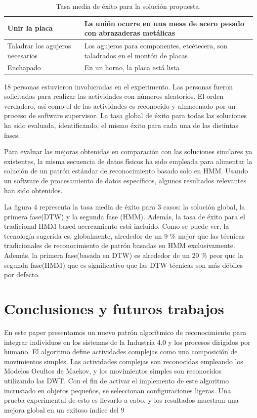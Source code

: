 \documentclass{article}
\begin{document}
\begin{table}[h]
\begin{center}
\begin{tabular}{ | p{4cm} | p{9cm} | }
			Unir la placa                                      & La unión ocurre en una mesa de acero pesado con abrazaderas metálicas                                                    \\ \hline
			Taladrar los agujeros necesarios                   & Los agujeros para componentes, etcétecera, son taladrados en el montón de placas                                         \\ \hline
			Enchapado                                          & En un horno, la placa está lista                                                                                         \\ \hline
		\end{tabular}
	\end{center}
	\caption{\label{fig:frog}Tasa media de éxito para la solución propuesta.}
\end{table}


18 personas estuvieron involucradas en el experimento. Las personas fueron solicitadas para realizar las actividades con números aleatorios. El orden verdadero, así como el de las actividades es reconocido y almacenado por un proceso de software supervisor. La tasa global de éxito para todas las soluciones ha sido evaluada, identificando, el mismo éxito para cada una de las distintas fases.

Para evaluar las mejoras obtenidas en comparación con las soluciones similares ya existentes, la misma secuencia de datos físicos ha sido empleada para alimentar la solución de un patrón estándar de reconocimiento basado solo en HMM. Usando un software de procesamiento de datos específicos, algunos resultados relevantes han sido obtenidos.

La figura 4 representa la tasa media de éxito para 3 casos: la solución global, la primera fase(DTW) y la segunda fase (HMM). Además, la tasa de éxito para el tradicional HMM-based acercamiento está incluido. Como se puede ver, la tecnología sugerida es, globalmente, alrededor de un 9 \% mejor que  las técnicas tradicionales de reconocimiento de patrón basadas en HMM exclusivamente. Además, la primera fase(basada en DTW) es alrededor de un 20 \% peor que la segunda fase(HMM) que es significativo que las DTW técnicas son más débiles por defecto.


\section {Conclusiones y futuros trabajos}
En este paper presentamos un nuevo patrón algorítmico de reconocimiento para integrar individuos en los sistemas de la Industria 4.0 y los procesos dirigidos por humano. El algoritmo define actividades complejas como una composición de movimientos simples. Las actividades complejas son reconocidas empleando los Modelos Ocultos de Maekov, y los movimientos simples son reconocidos utilizando las DWT. Con el fin de activar el implemento de este algoritmo incrustado en objetos pequeños, se seleccionan configuraciones ligeras. Una prueba experimental de esto es llevarlo a cabo, y los resultados muestran una mejora global en un exitoso índice del 9%
\end{document}
